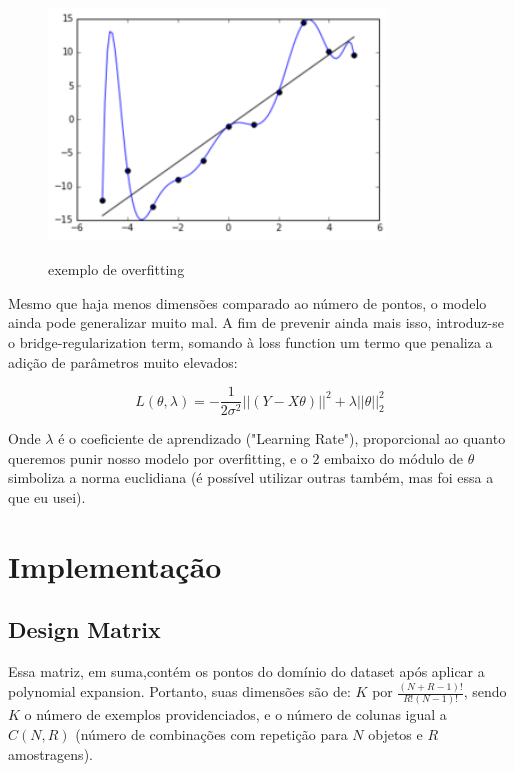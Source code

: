 \documentclass{article}
\begin{document}
\begin{figure}[h!]
    \includegraphics[width=9cm, height=7cm]{Overfitted_Data.png}
    \centering
    \caption{exemplo de overfitting}
  \end{figure}

Mesmo que haja menos dimensões comparado ao número de pontos,
o modelo ainda pode generalizar muito mal. A fim de prevenir
ainda mais isso, introduz-se o bridge-regularization term, 
somando à loss function um termo que penaliza a adição de 
parâmetros muito elevados:

\begin{equation} \label{eq:14}
    L(\theta, \lambda) = -\frac{1}{2\sigma^{2}}
    ||(Y - X\theta)||^{2} + \lambda
    ||\theta||_{2}^{2}
\end{equation}

Onde $\lambda$ é o coeficiente de aprendizado ("Learning Rate"),
proporcional ao quanto queremos punir nosso modelo por 
overfitting, e o $2$ embaixo do módulo de $\theta$ simboliza
a norma euclidiana (é possível utilizar outras também, mas 
foi essa a que eu usei).

\section{Implementação}

\subsection{Design Matrix}

Essa matriz, em suma,contém os 
pontos do domínio do dataset após aplicar a polynomial
expansion. Portanto, suas dimensões são de:
$K$ por $\frac{(N+R-1)!}{R!(N-1)!}$, sendo $K$ o número de 
exemplos providenciados, e o número de colunas igual a
$C(N,R)$ (número de combinações com repetição para $N$
objetos e $R$ amostragens).
\end{document}
